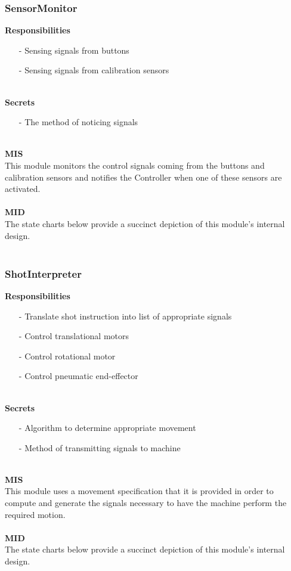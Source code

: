 \documentclass[titlepage]{article}
\begin{document}
\subsubsection{SensorMonitor}
\textbf{Responsibilities}
\begin{itemize}
	\item[-] Sensing signals from buttons
	\item[-] Sensing signals from calibration sensors
\end{itemize}~\\
\textbf{Secrets}
\begin{itemize}
	\item[-] The method of noticing signals
\end{itemize}~\\
\textbf{MIS}\\[2mm]
This module monitors the control signals coming from the buttons and calibration sensors and notifies the Controller when one of these sensors are activated.
\\\\
\textbf{MID}\\[2mm]
The state charts below provide a succinct depiction of this module's internal design.
\\\\
\subsubsection{ShotInterpreter}
\textbf{Responsibilities}
\begin{itemize}
	\item[-] Translate shot instruction into list of appropriate signals
	\item[-] Control translational motors
	\item[-] Control rotational motor
	\item[-] Control pneumatic end-effector
\end{itemize}~\\
\textbf{Secrets}
\begin{itemize}
	\item[-] Algorithm to determine appropriate movement
	\item[-] Method of transmitting signals to machine
\end{itemize}~\\
\textbf{MIS}\\[2mm]
This module uses a movement specification that it is provided in order to compute and generate the signals necessary to have the machine perform the required motion.
\\\\
\textbf{MID}\\[2mm]
The state charts below provide a succinct depiction of this module's internal design.
\\\\
\end{document}
